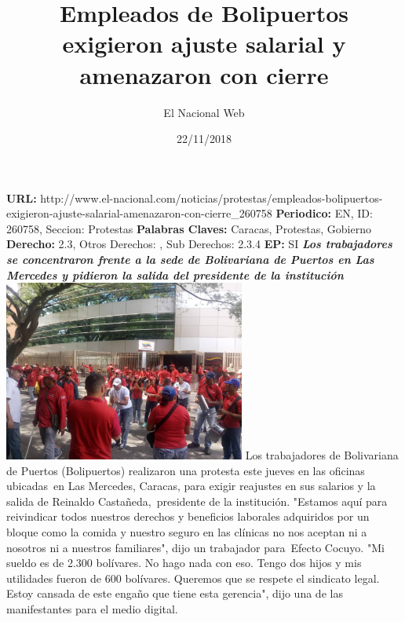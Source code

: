 \documentclass{article}%
\title{\textbf{Empleados de Bolipuertos exigieron ajuste salarial y amenazaron con cierre}}%
\author{El Nacional Web}%
\date{22/11/2018}%
\begin{document}
%
\normalsize%
\maketitle%
\textbf{URL: }%
http://www.el{-}nacional.com/noticias/protestas/empleados{-}bolipuertos{-}exigieron{-}ajuste{-}salarial{-}amenazaron{-}con{-}cierre\_260758\newline%
%
\textbf{Periodico: }%
EN, %
ID: %
260758, %
Seccion: %
Protestas\newline%
%
\textbf{Palabras Claves: }%
Caracas, Protestas, Gobierno\newline%
%
\textbf{Derecho: }%
2.3, %
Otros Derechos: %
, %
Sub Derechos: %
2.3.4\newline%
%
\textbf{EP: }%
SI\newline%
\newline%
%
\textbf{\textit{Los trabajadores se concentraron frente a la sede de Bolivariana de Puertos en Las Mercedes y pidieron la salida del presidente de la institución}}%
\newline%
\newline%
%
\includegraphics[width=300px]{138.jpg}%
\newline%
%
Los trabajadores de Bolivariana de Puertos (Bolipuertos) realizaron una protesta este jueves en las oficinas ubicadas~en Las Mercedes, Caracas, para exigir reajustes en sus salarios y la salida de Reinaldo Castañeda,~presidente de la institución.%
\newline%
%
"Estamos aquí para reivindicar todos nuestros derechos y beneficios laborales adquiridos por un bloque como la comida y nuestro seguro en las clínicas no nos aceptan ni a nosotros ni a nuestros familiares", dijo un trabajador para~Efecto Cocuyo.%
\newline%
%
"Mi sueldo es de 2.300 bolívares. No hago nada con eso. Tengo dos hijos y mis utilidades fueron de 600 bolívares. Queremos que se respete el sindicato legal. Estoy cansada de este engaño que tiene esta gerencia", dijo una de las manifestantes para el medio digital.%
\end{document}
